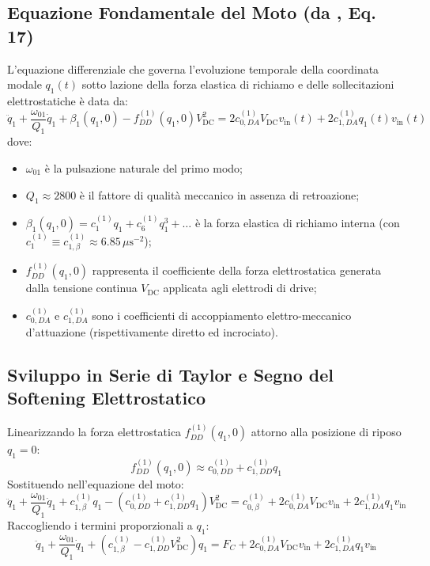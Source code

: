 \documentclass[11pt,a4paper]{article}
\begin{document}
\subsection{Equazione Fondamentale del Moto (da \cite{Frangi2023}, Eq. 17)}
L'equazione differenziale che governa l'evoluzione temporale della coordinata modale $q_1(t)$ sotto lazione della forza elastica di richiamo e delle sollecitazioni elettrostatiche è data da:
\begin{equation}
    \ddot{q}_1 + \frac{\omega_{01}}{Q_1} \dot{q}_1 + \beta_1(q_1, 0) - f_{DD}^{(1)}(q_1, 0) V_{\text{DC}}^2 = 2 c_{0,DA}^{(1)} V_{\text{DC}} v_{\text{in}}(t) + 2 c_{1,DA}^{(1)} q_1(t) v_{\text{in}}(t)
    \label{eq:governing_full}
\end{equation}
dove:
\begin{itemize}
    \item $\omega_{01}$ è la pulsazione naturale del primo modo;
    \item $Q_1 \approx 2800$ è il fattore di qualità meccanico in assenza di retroazione;
    \item $\beta_1(q_1, 0) = c_1^{(1)} q_1 + c_6^{(1)} q_1^3 + \dots$ è la forza elastica di richiamo interna (con $c_1^{(1)} \equiv c_{1,\beta}^{(1)} \approx 6.85\,\mu\text{s}^{-2}$);
    \item $f_{DD}^{(1)}(q_1, 0)$ rappresenta il coefficiente della forza elettrostatica generata dalla tensione continua $V_{\text{DC}}$ applicata agli elettrodi di drive;
    \item $c_{0,DA}^{(1)}$ e $c_{1,DA}^{(1)}$ sono i coefficienti di accoppiamento elettro-meccanico d'attuazione (rispettivamente diretto ed incrociato).
\end{itemize}

\subsection{Sviluppo in Serie di Taylor e Segno del Softening Elettrostatico}
Linearizzando la forza elettrostatica $f_{DD}^{(1)}(q_1, 0)$ attorno alla posizione di riposo $q_1 = 0$:
\begin{equation}
    f_{DD}^{(1)}(q_1, 0) \approx c_{0,DD}^{(1)} + c_{1,DD}^{(1)} q_1
\end{equation}
Sostituendo nell'equazione del moto:
\begin{equation}
    \ddot{q}_1 + \frac{\omega_{01}}{Q_1} \dot{q}_1 + c_{1,\beta}^{(1)} q_1 - \left( c_{0,DD}^{(1)} + c_{1,DD}^{(1)} q_1 \right) V_{\text{DC}}^2 = c_{0,\beta}^{(1)} + 2 c_{0,DA}^{(1)} V_{\text{DC}} v_{\text{in}} + 2 c_{1,DA}^{(1)} q_1 v_{\text{in}}
\end{equation}
Raccogliendo i termini proporzionali a $q_1$:
\begin{equation}
    \ddot{q}_1 + \frac{\omega_{01}}{Q_1} \dot{q}_1 + \left( c_{1,\beta}^{(1)} - c_{1,DD}^{(1)} V_{\text{DC}}^2 \right) q_1 = F_C + 2 c_{0,DA}^{(1)} V_{\text{DC}} v_{\text{in}} + 2 c_{1,DA}^{(1)} q_1 v_{\text{in}}
    \label{eq:governing_softening}
\end{equation}
\end{document}
